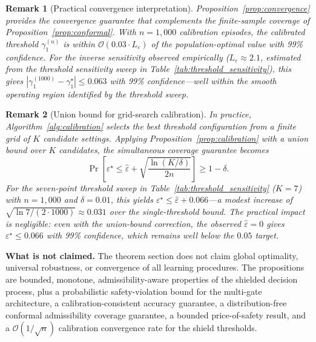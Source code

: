 \documentclass[10pt,journal,compsoc]{IEEEtran}
\newtheorem{remark}{Remark}
\begin{document}
\begin{remark}[Practical convergence interpretation]
Proposition~\ref{prop:convergence} provides the convergence guarantee that complements the finite-sample coverage of Proposition~\ref{prop:conformal}.
With $n = 1{,}000$ calibration episodes, the calibrated threshold $\gamma_1^{(n)}$ is within $\mathcal{O}(0.03 \cdot L_\varepsilon)$ of the population-optimal value with 99\% confidence.
For the inverse sensitivity observed empirically ($L_\varepsilon \approx 2.1$, estimated from the threshold sensitivity sweep in Table~\ref{tab:threshold_sensitivity}), this gives $|\gamma_1^{(1000)} - \gamma_1^\star| \le 0.063$ with 99\% confidence---well within the smooth operating region identified by the threshold sweep.
\end{remark}

\begin{remark}[Union bound for grid-search calibration]
\label{rem:union_bound}
In practice, Algorithm~\ref{alg:calibration} selects the best threshold configuration from a finite grid of $K$ candidate settings.
Applying Proposition~\ref{prop:calibration} with a union bound over $K$ candidates, the simultaneous coverage guarantee becomes
\[
\Pr\!\left[\varepsilon^\star \le \hat{\varepsilon} + \sqrt{\frac{\ln(K/\delta)}{2n}}\right] \ge 1 - \delta.
\]
For the seven-point threshold sweep in Table~\ref{tab:threshold_sensitivity} ($K=7$) with $n=1{,}000$ and $\delta=0.01$, this yields $\varepsilon^\star \le \hat{\varepsilon} + 0.066$---a modest increase of $\sqrt{\ln 7/(2 \cdot 1000)} \approx 0.031$ over the single-threshold bound.
The practical impact is negligible: even with the union-bound correction, the observed $\hat{\varepsilon} = 0$ gives $\varepsilon^\star \le 0.066$ with 99\% confidence, which remains well below the $0.05$ target.
\end{remark}

\noindent\textbf{What is not claimed.}
The theorem section does not claim global optimality, universal robustness, or convergence of all learning procedures.
The propositions are bounded, monotone, admissibility-aware properties of the shielded decision process, plus a probabilistic safety-violation bound for the multi-gate architecture, a calibration-consistent accuracy guarantee, a distribution-free conformal admissibility coverage guarantee, a bounded price-of-safety result, and a $\mathcal{O}(1/\sqrt{n})$ calibration convergence rate for the shield thresholds.


\end{document}
